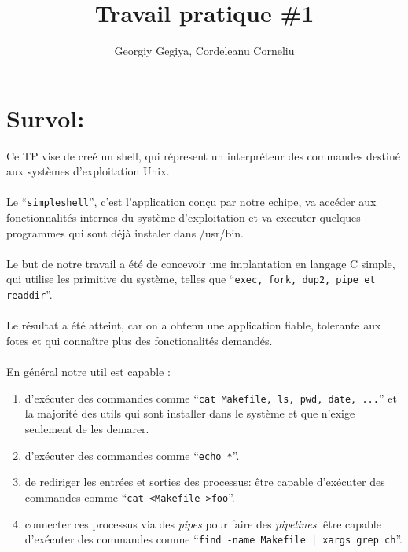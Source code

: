 \documentclass{article}
\title{Travail pratique \#1}
\author{Georgiy Gegiya, Cordeleanu Corneliu}
\begin{document}
\maketitle

\newcommand \mML {\ensuremath\mu\textsl{ML}}
\newcommand \kw [1] {\textsf{#1}}
\newcommand \id [1] {\textsl{#1}}
\newcommand \punc [1] {\kw{`#1'}}
\newcommand \str [1] {\texttt{"#1"}}
\newenvironment{outitemize}{
  \begin{itemize}
  \let \origitem \item \def \item {\origitem[]\hspace{-18pt}}
}{
  \end{itemize}
}
\newcommand \Align [2][t] {
  \begin{array}[#1]{@{}l}
    #2
  \end{array}}

\section{Survol:}
Ce TP vise de creé un shell, qui répresent un interpréteur des commandes destiné
aux systèmes d'exploitation Unix. 
\\\\
Le ``\texttt{simpleshell}'', c'est l'application conçu par notre echipe, 
va accéder aux fonctionnalités internes du système d'exploitation
et va executer quelques programmes qui sont déjà instaler dans /usr/bin. 
\\\\
Le but de notre travail a été de concevoir une implantation en langage C simple, qui
utilise les primitive du système, telles que ``\texttt{exec, fork, dup2, pipe et readdir}''.
\\\\
Le résultat a été atteint, car on a obtenu une application fiable, tolerante aux fotes et
qui connaître plus des fonctionalités demandés.
\\\\
En général notre util est capable :
\begin{enumerate}
\item d'exécuter des commandes comme ``\texttt{cat Makefile, ls, pwd, date, ...}'' 
et la majorité des utils qui sont installer dans le système et que n'exige seulement de 
les demarer.
\item d'exécuter des commandes comme ``\texttt{echo *}''.
\item de rediriger les entrées et sorties des processus: être capable
d'exécuter des commandes comme ``\texttt{cat <Makefile >foo}''.
\item connecter ces processus via des \emph{pipes} pour faire des \emph{pipelines}:
être capable d'exécuter des commandes comme ``\texttt{find -name Makefile | xargs grep ch}''.
\end{enumerate}  
\end{document}
